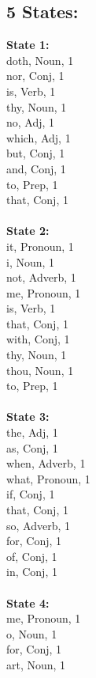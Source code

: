 \begin{multicols}{4}

\section{\textbf{5 States:}}

\noindent\textbf{State 1:} \\
doth, Noun, 1\\
nor, Conj, 1\\
is, Verb, 1\\
thy, Noun, 1\\
no, Adj, 1\\
which, Adj, 1\\
but, Conj, 1\\
and, Conj, 1\\
to, Prep, 1\\
that, Conj, 1\\
\\
\noindent\textbf{State 2:} \\
it, Pronoun, 1\\
i, Noun, 1\\
not, Adverb, 1\\
me, Pronoun, 1\\
is, Verb, 1\\
that, Conj, 1\\
with, Conj, 1\\
thy, Noun, 1\\
thou, Noun, 1\\
to, Prep, 1\\
\\
\noindent\textbf{State 3:} \\
the, Adj, 1\\
as, Conj, 1\\
when, Adverb, 1\\
what, Pronoun, 1\\
if, Conj, 1\\
that, Conj, 1\\
so, Adverb, 1\\
for, Conj, 1\\
of, Conj, 1\\
in, Conj, 1\\
\\
\noindent\textbf{State 4:} \\
me, Pronoun, 1\\
o, Noun, 1\\
for, Conj, 1\\
art, Noun, 1\\

\end{multicols}
